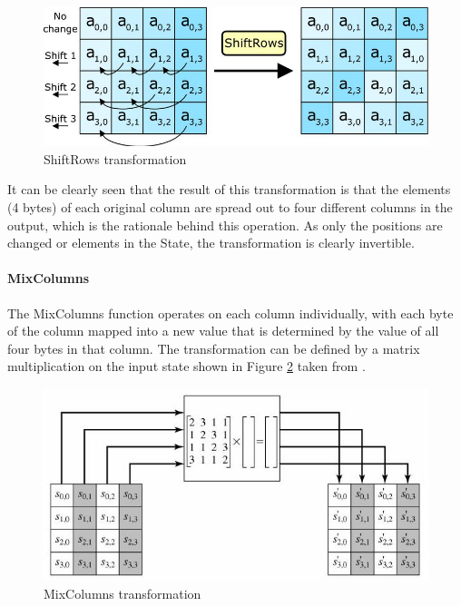 \documentclass[a4paper,12pt]{report}
\begin{document}
\begin{figure}[htb]
\centering
\includegraphics[scale=0.3]{images/shiftrows.jpg}
\caption{ShiftRows transformation}
\label{fig:shiftrows}
\end{figure}

It can be clearly seen that the result of this transformation is that the elements (4 bytes) of each original column are spread out to four different columns in the output, which is the rationale behind this operation. As only the positions are changed or elements in the State, the transformation is clearly invertible. 

\paragraph{MixColumns}

The MixColumns function operates on each column individually, with each byte of the column mapped into a new value that is determined by the value of all four bytes in that column. The transformation can be defined by a matrix multiplication on the input state shown in Figure \ref{fig:mixcols1} taken from \cite{aesmixcols}.

\begin{figure}[htb]
\centering
\includegraphics[scale=0.6]{images/mixcols1.jpg}
\caption{MixColumns transformation}
\label{fig:mixcols1}
\end{figure}
\end{document}
